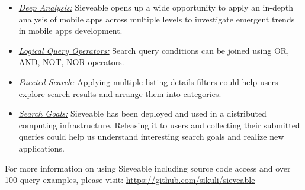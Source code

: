 \begin{itemize}
	
	\item\underline{\textit{Deep Analysis:}} Sieveable opens up a wide opportunity to apply an in-depth analysis of mobile apps across multiple levels to investigate emergent trends in mobile apps development.
	
	\item \underline{\textit{Logical Query Operators:}} Search query conditions can be joined using OR, AND, NOT, NOR operators.
	
	\item \underline{\textit{Faceted Search:}} Applying multiple listing details filters could help users explore search results and arrange them into categories.
	
	\item\underline{\textit{Search Goals:}} Sieveable has been deployed and used in a distributed computing infrastructure.
	Releasing it to users and collecting their submitted queries could help us understand interesting search goals \cite{rose_2004_WWW_understanding} and realize new applications.
	
\end{itemize}
For more information on using Sieveable including source code access and over 100 query examples, please visit:
\url{https://github.com/sikuli/sieveable}
